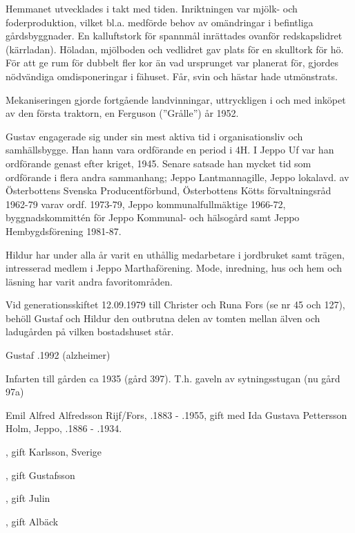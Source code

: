 Hemmanet utvecklades i takt med tiden. Inriktningen var mjölk- och foderproduktion, vilket bl.a. medförde behov av omändringar i befintliga gårdsbyggnader. En kalluftstork för spannmål inrättades ovanför redskapslidret (kärrladan). Höladan, mjölboden och vedlidret gav plats för en skulltork för hö. För att ge rum för dubbelt fler kor än vad ursprunget var planerat för, gjordes nödvändiga omdisponeringar i fähuset. Får, svin och hästar hade utmönstrats.

Mekaniseringen gjorde fortgående landvinningar, uttryckligen i och med inköpet av den första traktorn, en Ferguson (”Grålle”) år 1952.

Gustav engagerade sig under sin mest aktiva tid i organisationsliv och samhällsbygge. Han hann vara ordförande en period i 4H. I Jeppo Uf var han ordförande genast efter kriget, 1945. Senare satsade han mycket tid som ordförande i flera andra sammanhang; Jeppo Lantmannagille, Jeppo lokalavd. av Österbottens Svenska Producentförbund, Österbottens Kötts förvaltningsråd 1962-79 varav ordf. 1973-79, Jeppo kommunalfullmäktige 1966-72, byggnadskommittén för Jeppo Kommunal- och hälsogård samt Jeppo Hembygdsförening 1981-87.

Hildur har under alla år varit en uthållig medarbetare i jordbruket samt trägen, intresserad medlem i Jeppo Marthaförening. Mode, inredning, hus och hem och läsning har varit andra favoritområden.

Vid generationsskiftet 12.09.1979 till Christer och Runa Fors (se nr 45 och 127), behöll Gustaf och Hildur den outbrutna delen av tomten mellan älven och ladugården på vilken bostadshuset står.

Gustaf .1992 (alzheimer)



 Infarten till gården ca 1935 (gård 397). T.h. gaveln av sytningsstugan (nu gård 97a)

Emil Alfred Alfredsson Rijf/Fors, .1883 - .1955, gift med Ida Gustava Pettersson Holm, Jeppo, .1886 - .1934.
\begin{jhchildren}
  \item {}, gift Karlsson, Sverige
  \item {}, gift Gustafsson
  \item {}, gift Julin
  \item {}
  \item {}, gift Albäck
\end{jhchildren}


